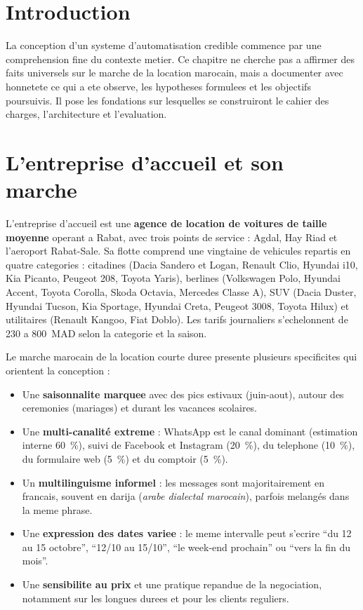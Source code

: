 \documentclass[12pt,a4paper,openany]{report}
\begin{document}
\section{Introduction}
La conception d'un systeme d'automatisation credible commence par une comprehension fine du contexte metier. Ce chapitre ne cherche pas a affirmer des faits universels sur le marche de la location marocain, mais a documenter avec honnetete ce qui a ete observe, les hypotheses formulees et les objectifs poursuivis. Il pose les fondations sur lesquelles se construiront le cahier des charges, l'architecture et l'evaluation.

\section{L'entreprise d'accueil et son marche}

L'entreprise d'accueil est une \textbf{agence de location de voitures de taille moyenne} operant a Rabat, avec trois points de service : Agdal, Hay Riad et l'aeroport Rabat-Sale. Sa flotte comprend une vingtaine de vehicules repartis en quatre categories : citadines (Dacia Sandero et Logan, Renault Clio, Hyundai i10, Kia Picanto, Peugeot 208, Toyota Yaris), berlines (Volkswagen Polo, Hyundai Accent, Toyota Corolla, Skoda Octavia, Mercedes Classe A), SUV (Dacia Duster, Hyundai Tucson, Kia Sportage, Hyundai Creta, Peugeot 3008, Toyota Hilux) et utilitaires (Renault Kangoo, Fiat Doblo). Les tarifs journaliers s'echelonnent de 230 a 800~MAD selon la categorie et la saison.

Le marche marocain de la location courte duree presente plusieurs specificites qui orientent la conception :
\begin{itemize}[leftmargin=1.5cm]
    \item Une \textbf{saisonnalite marquee} avec des pics estivaux (juin-aout), autour des ceremonies (mariages) et durant les vacances scolaires.
    \item Une \textbf{multi-canalité extreme} : WhatsApp est le canal dominant (estimation interne 60~\%), suivi de Facebook et Instagram (20~\%), du telephone (10~\%), du formulaire web (5~\%) et du comptoir (5~\%).
    \item Un \textbf{multilinguisme informel} : les messages sont majoritairement en francais, souvent en darija (\emph{arabe dialectal marocain}), parfois melangés dans la meme phrase.
    \item Une \textbf{expression des dates variee} : le meme intervalle peut s'ecrire ``du 12 au 15 octobre'', ``12/10 au 15/10'', ``le week-end prochain'' ou ``vers la fin du mois''.
    \item Une \textbf{sensibilite au prix} et une pratique repandue de la negociation, notamment sur les longues durees et pour les clients reguliers.
\end{itemize}
\end{document}
